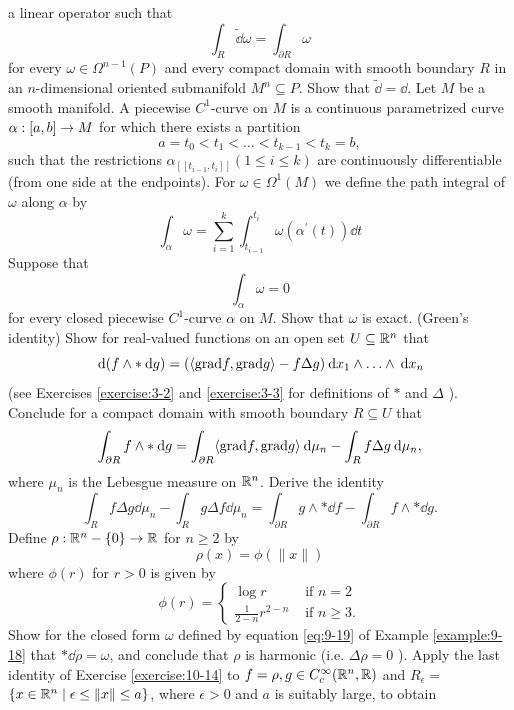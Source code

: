 \begin{enumerate}[label=\theexercise.\arabic*.,ref=\theexercise.\arabic*,leftmargin=2.7em]
\[    \]
    a linear operator such that
    \[
      \int_{R}\widetilde{\dd}\omega  =\int_{\partial R}\omega
    \]
    for every $\omega  \in  {\Omega }^{n- 1}( P)$ and every compact domain with smooth boundary $R$ in an $n$-dimensional oriented submanifold ${M}^{n} \subseteq  P$. Show that $\widetilde{\dd} = \dd$.
  \NewItem Let $M$ be a smooth manifold. A piecewise ${C}^{1}$-curve on $M$ is a continuous parametrized curve $\alpha  : [  {a,b}]   \rightarrow  M$ for which there exists a partition
    \[
      a = {t}_{0} < {t}_{1} < \ldots  < {t}_{k- 1} < {t}_{k} = b,
    \]
    such that the restrictions ${\alpha }_{[  [  {t}_{i- 1},{t}_{i}]  ]  }( {1 \leq  i \leq  k})$ are continuously differentiable (from one side at the endpoints). For $\omega  \in  {\Omega }^{1}( M)$ we define the path integral of $\omega$ along $\alpha$ by
    \[
      \int_{\alpha }\omega  = \sum_{i=1}^{k}\int_{{t}_{i- 1}}^{{t}_{i}}\omega ( {{\alpha }^{\prime }( t) }) {\dd t}
    \]
    Suppose that
    \[
      \int_{\alpha }\omega  = 0
    \]
    for every closed piecewise ${C}^{1}$-curve $\alpha$ on $M$. Show that $\omega$ is exact.
  \NewItem (Green's identity) Show for real-valued functions on an open set $U \subseteq  {\ensuremath{\mathbb{R}}}^{n}$ that
    \[
      \dd ( {f \land   * {\dd g}})  = ( {\langle \R{grad}f,\R{grad}g\rangle - {f\Delta g}}) \dd {x}_{1} \land  \ldots  \land  \dd {x}_{n}
    \]
    (see Exercises \ref{exercise:3-2} and \ref{exercise:3-3} for definitions of $*$ and $\Delta$ ).
    Conclude for a compact domain with smooth boundary $R \subseteq  U$ that
    \[
     \int_{\partial R}f \land   * {\dd g} =\int_{\partial R}\langle \R{grad}f,\R{grad}g\rangle \dd {\mu }_{n}-\int_{R}{f\Delta g\dd}{\mu }_{n},
    \]
    where ${\mu }_{n}$ is the Lebesgue measure on ${\mathbb{R}}^{n}$. Derive the identity
    \[
     \int_{R}{f\Delta g\dd }{\mu }_{n}-\int_{R}{g\Delta f\dd }{\mu }_{n} =\int_{\partial R}g \land   * {\dd f}-\int_{\partial R}f \land   * {\dd g}.
    \]
  \NewItem Define $\rho  : {\mathbb{R}}^{n}- \{ 0\}  \rightarrow  \mathbb{R}$ for $n \geq  2$ by
    \[
      \rho ( x)  = \phi ( {\| x\| })
    \]
    where $\phi ( r)$ for $r > 0$ is given by
    \[
      \phi ( r)  = \begin{cases} \log r & \text{ if }n = 2 \\  \frac{1}{2- n}{r}^{2- n} & \text{ if }n \geq  3. \end{cases}
    \]
    Show for the closed form $\omega$ defined by equation \eqref{eq:9-19} of Example \ref{example:9-18} that $*{\dd\rho } = \omega$, and conclude that $\rho$ is harmonic (i.e. ${\Delta \rho } = 0$ ). Apply the last identity of Exercise \ref{exercise:10-14} to $f = \rho,g \in  {C}_{c}^{\infty }( {{\mathbb{R}}^{n},\mathbb{R}})$ and ${R}_{\epsilon } =$  $\left\{  {x \in  {\ensuremath{\mathbb{R}}}^{n} \mid  \epsilon  \leq  \| x\|  \leq  a}\right\}$, where $\epsilon  > 0$ and $a$ is suitably large, to obtain

\end{enumerate}
